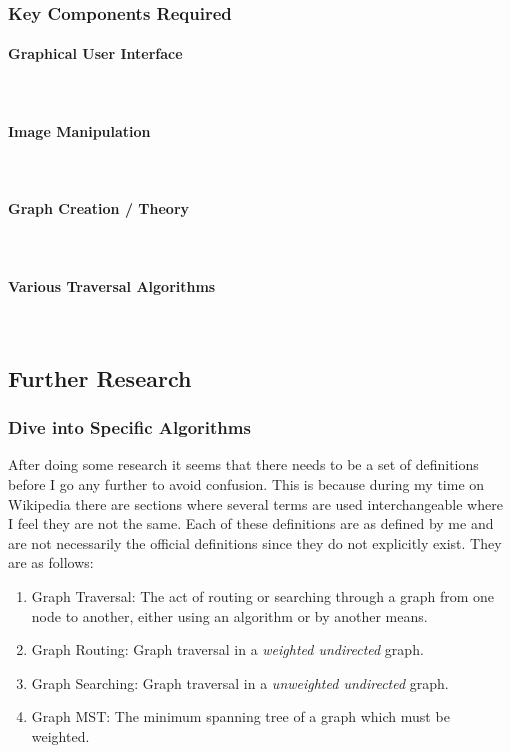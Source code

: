 \begin{flushleft}
            \subsubsection{Key Components Required}
            \paragraph{Graphical User Interface} \mbox{} \\
            \bk
            \paragraph{Image Manipulation} \mbox{} \\
            \bk
            \paragraph{Graph Creation / Theory} \mbox{} \\
            \bk
            \paragraph{Various Traversal Algorithms} \mbox{} \\
            \bk


        \subsection{Further Research}
            \subsubsection{Dive into Specific Algorithms}
            After doing some research it seems that there needs to be a set of definitions before I go any further to avoid confusion. This is because during my time on Wikipedia there are sections
            where several terms are used interchangeable where I feel they are not the same. Each of these definitions are as defined by me and are not necessarily the official definitions since they 
            do not explicitly exist. They are as follows: \\ \bk
            \begin{enumerate}
                \item Graph Traversal: The act of routing or searching through a graph from one node to another, either using an algorithm or by another means.
                \item Graph Routing: Graph traversal in a \emph{weighted undirected} graph.
                \item Graph Searching: Graph traversal in a \emph{unweighted undirected} graph.
                \item Graph MST: The minimum spanning tree of a graph which must be weighted.
            \end{enumerate}


\end{flushleft}
